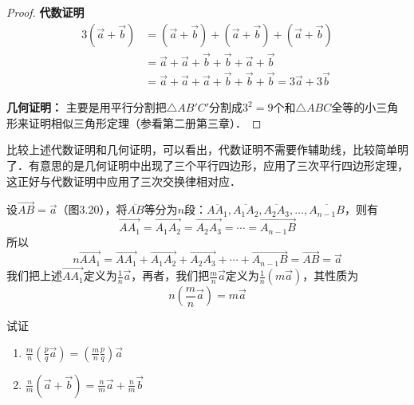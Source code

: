 \begin{proof}
\textbf{代数证明}
\begin{align*}
3 \left(\vec{a}+\vec{b}\right) &= \left(\vec{a}+\vec{b}\right)+\left(\vec{a}+\vec{b}\right)+\left(\vec{a}+\vec{b}\right)  \tag{用一次交换律}\\
&=\vec{a}+\vec{a}+\vec{b}+\vec{b}+\vec{a}+\vec{b} \tag{用两次交换律}\\
&= \vec{a}+\vec{a}+\vec{a}+\vec{b}+\vec{b}+\vec{b} =3\vec{a}+3\vec{b}
\end{align*}

\textbf{几何证明：}
主要是用平行分割把$\triangle AB'C'$分割成$3^2=9$个和$\triangle ABC$全等的小三角形来证明相似三角形定理（参看第二册第三章）．
\end{proof}

比较上述代数证明和几何证明，可以看出，代数证明不需要作辅助线，比较简单明了．有意思的是几何证明中出现了三个平行四边形，应用了三次平行四边形定理，这正好与代数证明中应用了三次交换律相对应．

设$\Vec{AB}=\vec{a}$（图3.20），将$\overline{AB}$等分为$n$段：$\overline{AA_1},\overline{A_1A_2},\overline{A_2A_3},\ldots,\overline{A_{n-1}B}$，则有
\[\Vec{AA_1}=\Vec{A_1A_2}=\Vec{A_2A_3}=\cdots=\Vec{A_{n-1}B}\]
所以
\[n\Vec{AA_1}=\Vec{AA_1}+\Vec{A_1A_2}+\Vec{A_2A_3}+\cdots+\Vec{A_{n-1}B}=\Vec{AB}=\vec{a}\]
我们把上述$\Vec{AA_1}$定义为$\frac{1}{n}\vec{a}$，再者，我们把$\frac{m}{n}\vec{a}$定义为$\frac{1}{n}\left(m\vec{a}\right)$，其性质为
\[n\left(\frac{m}{n}\vec{a}\right)=m\vec{a}\]


\begin{example}
    试证
\begin{enumerate}
    \item $\frac{m}{n}\left(\frac{p}{q}\vec{a}\right)=\left(\frac{m}{n}\frac{p}{q}\right)\vec{a}$
    \item $\frac{n}{m}\left(\vec{a}+\vec{b}\right)=\frac{n}{m}\vec{a}+\frac{n}{m}\vec{b}$
\end{enumerate}
\end{example}

